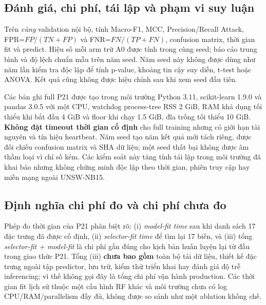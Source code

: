 \subsection{Đánh giá, chi phí, tái lập và phạm vi suy luận}
Trên \emph{cùng} validation nội bộ, tính Macro-F1, MCC, Precision/Recall Attack, FPR=$FP/(TN+FP)$ và FNR=$FN/(TP+FN)$, confusion matrix, thời gian fit và predict. Hiệu số mỗi arm trừ A0 được tính trong cùng seed; báo cáo trung bình và độ lệch chuẩn mẫu trên năm seed. Năm seed này không được dùng như năm lần kiểm tra độc lập để tính p-value, khoảng tin cậy suy diễn, t-test hoặc ANOVA. Kết quả cũng không được hiệu chỉnh sau khi xem seed đầu tiên.

Các bản ghi full P21 được tạo trong môi trường Python 3.11, scikit-learn 1.9.0 và pandas 3.0.5 với một CPU, watchdog process-tree RSS 2 GiB, RAM khả dụng tối thiểu khi bắt đầu 4 GiB và floor khi chạy 1.5 GiB, đĩa trống tối thiểu 10 GiB. \textbf{Không đặt timeout thời gian cố định} cho full training nhưng có giới hạn tài nguyên và tín hiệu heartbeat. Năm seed tạo năm kết quả mới tách riêng, được đối chiếu confusion matrix và SHA dữ liệu; một seed thất bại không được âm thầm loại vì chỉ số kém. Các kiểm soát này tăng tính tái lập trong môi trường đã khai báo nhưng không chứng minh độc lập theo thời gian, phiên truy cập hay miền mạng ngoài UNSW-NB15.


\subsection{Định nghĩa chi phí đo và chi phí chưa đo}
Phép đo thời gian của P21 phân biệt rõ: (i) \emph{model-fit time} sau khi danh sách 17 đặc trưng đã được cố định, (ii) \emph{selector-fit time} để tìm lại 17 biến, và (iii) tổng \emph{selector-fit + model-fit} là chi phí gần đúng cho kịch bản huấn luyện lại từ đầu trong giao thức P21. Tổng (iii) \textbf{chưa bao gồm} toàn bộ tải dữ liệu, thiết kế đặc trưng ngoài tập predictor, lưu trữ, kiểm thử triển khai hay đánh giá độ trễ inferencing; vì thế không gọi đây là tổng chi phí vận hành production. Các thời gian fit lịch sử thuộc một cấu hình RF khác và môi trường chưa có log CPU/RAM/parallelism đầy đủ, không được so sánh như một ablation khống chế.
